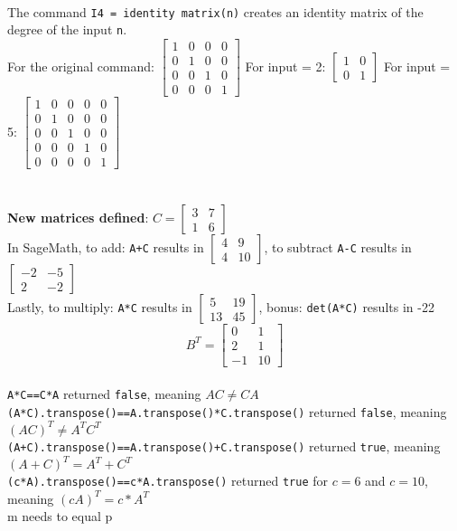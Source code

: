 \documentclass{article}
\begin{document}
\\[0.1in] The command \verb+I4 = identity matrix(n)+ creates an identity matrix of the degree of the input \verb+n+. 
\\For the original command: $\begin{bmatrix}1 & 0 & 0 & 0 \\0 & 1 & 0 & 0 \\0 & 0 & 1 & 0 \\0 & 0 & 0 & 1\end{bmatrix}$ 
For input = 2: $\begin{bmatrix}1 & 0 \\0 & 1\end{bmatrix}$
For input = 5: $\begin{bmatrix}1 & 0 & 0 & 0 & 0 \\0 & 1 & 0 & 0 & 0 \\0 & 0 & 1 & 0 & 0 \\0 & 0 & 0 & 1 & 0 \\0 & 0 & 0 & 0 & 1\end{bmatrix}$
\pagebreak
\section{}
\textbf{New matrices defined}: $C=\begin{bmatrix}3 & 7 \\1 & 6\end{bmatrix}$
\\[0.05in]In SageMath, to add: \verb|A+C| results in $\begin{bmatrix}4 & 9 \\4 & 10\end{bmatrix}$, to subtract \verb|A-C| results in $\begin{bmatrix}-2 & -5 \\2 & -2\end{bmatrix}$
\\[0.05in] Lastly, to multiply: \verb|A*C| results in $\begin{bmatrix}5 & 19 \\13 & 45\end{bmatrix}$, bonus: \verb+det(A*C)+ results in -22
$$B^T=\begin{bmatrix}0 & 1 \\2 & 1 \\-1 & 10\end{bmatrix}$$
\\[0.1in] \verb+A*C==C*A+ returned \verb+false+, meaning $AC\neq CA$
\\[0.1in] \verb+(A*C).transpose()==A.transpose()*C.transpose()+ returned \verb+false+, meaning $(AC)^T\neq A^TC^T$
\\[0.1in] \verb|(A+C).transpose()==A.transpose()+C.transpose()| returned \verb+true+, meaning $(A+C)^T=A^T+C^T$
\\[0.1in] \verb|(c*A).transpose()==c*A.transpose()| returned \verb|true| for $c=6$ and $c=10$, meaning $(cA)^T=c*A^T$
\\[0.1in] m needs to equal p
\end{document}
